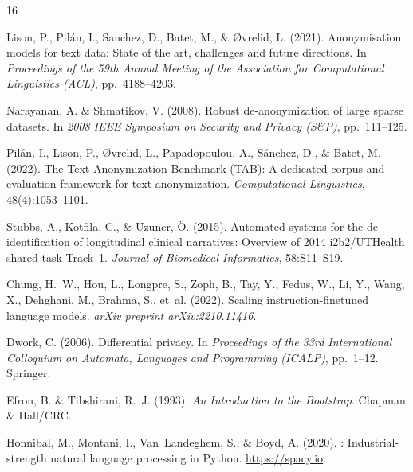 \documentclass[10pt,twocolumn]{article}
\begin{document}

\begin{thebibliography}{16}

Lison, P., Pilán, I., Sanchez, D., Batet, M., \& {\O}vrelid, L. (2021).
\newblock Anonymisation models for text data: State of the art, challenges and future directions.
\newblock In \emph{Proceedings of the 59th Annual Meeting of the Association for Computational Linguistics (ACL)}, pp.\ 4188--4203.

Narayanan, A. \& Shmatikov, V. (2008).
\newblock Robust de-anonymization of large sparse datasets.
\newblock In \emph{2008 IEEE Symposium on Security and Privacy (S\&P)}, pp.\ 111--125.

Pilán, I., Lison, P., {\O}vrelid, L., Papadopoulou, A., Sánchez, D., \& Batet, M. (2022).
\newblock The Text Anonymization Benchmark ({TAB}): A dedicated corpus and evaluation framework for text anonymization.
\newblock \emph{Computational Linguistics}, 48(4):1053--1101.

Stubbs, A., Kotfila, C., \& Uzuner, {\"O}. (2015).
\newblock Automated systems for the de-identification of longitudinal clinical narratives: Overview of 2014 i2b2/{UT}Health shared task Track~1.
\newblock \emph{Journal of Biomedical Informatics}, 58:S11--S19.

Chung, H.~W., Hou, L., Longpre, S., Zoph, B., Tay, Y., Fedus, W., Li, Y., Wang, X., Dehghani, M., Brahma, S., et~al. (2022).
\newblock Scaling instruction-finetuned language models.
\newblock \emph{arXiv preprint arXiv:2210.11416}.

Dwork, C. (2006).
\newblock Differential privacy.
\newblock In \emph{Proceedings of the 33rd International Colloquium on Automata, Languages and Programming (ICALP)}, pp.\ 1--12. Springer.

Efron, B. \& Tibshirani, R.~J. (1993).
\newblock \emph{An Introduction to the Bootstrap}.
\newblock Chapman \& Hall/CRC.

Honnibal, M., Montani, I., Van~Landeghem, S., \& Boyd, A. (2020).
: Industrial-strength natural language processing in {P}ython.
\newblock \url{https://spacy.io}.


\end{thebibliography}
\end{document}
